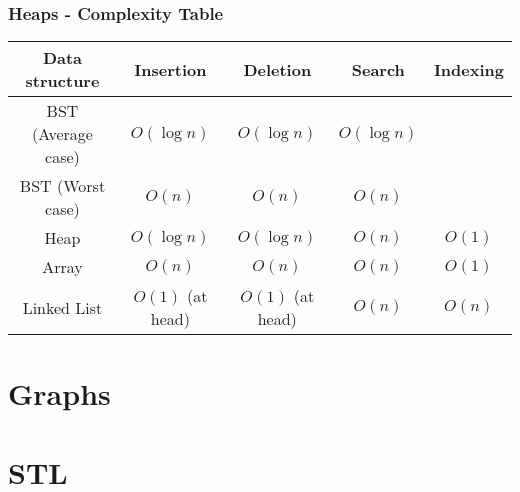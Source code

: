 \documentclass[c, aspectratio=169]{beamer}
\begin{document}
%
%
%

\begin{frame}\frametitle{Heaps - Complexity Table}
\begin{center}
\begin{tabular}{|c|c|c|c|c|}
\hline
Data structure & Insertion & Deletion & Search & Indexing\\\hline
BST (Average case) & $O(\log n)$ & $O(\log n)$ & $O(\log n)$ & \\\hline
BST (Worst case) & $O(n)$ & $O(n)$ & $O(n)$ & \\\hline
Heap & $O(\log n)$ & $O(\log n)$ & $O(n)$ & $O(1)$ \\\hline
Array & $O(n)$ & $O(n)$ & $O(n)$ & $O(1)$ \\
Linked List & $O(1)$ (at head) & $O(1)$ (at head) & $O(n)$ & $O(n)$ \\\hline
\end{tabular}
\end{center}
\end{frame}

\section{Graphs}
\begin{frame}\end{frame}
\begin{frame}\end{frame}
\begin{frame}\end{frame}




\section{STL}
\begin{frame}\end{frame}
\begin{frame}\end{frame}
\begin{frame}\end{frame}
\end{document}
